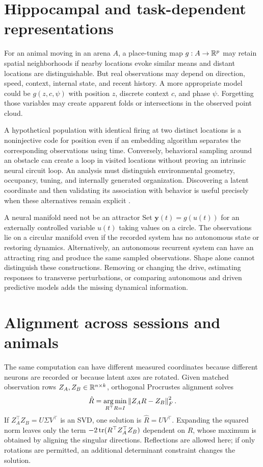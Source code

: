 \section{Hippocampal and task-dependent representations}
For an animal moving in an arena $A$, a place-tuning map $g:A\to\mathbb{R}^p$ may retain spatial neighborhoods if nearby locations evoke similar means and distant locations are distinguishable. But real observations may depend on direction, speed, context, internal state, and recent history. A more appropriate model could be $g(z,c,\psi)$ with position $z$, discrete context $c$, and phase $\psi$. Forgetting those variables may create apparent folds or intersections in the observed point cloud.

A hypothetical population with identical firing at two distinct locations is a noninjective code for position even if an embedding algorithm separates the corresponding observations using time. Conversely, behavioral sampling around an obstacle can create a loop in visited locations without proving an intrinsic neural circuit loop. An analysis must distinguish environmental geometry, occupancy, tuning, and internally generated organization. Discovering a latent coordinate and then validating its association with behavior is useful precisely when these alternatives remain explicit \citep{app_rubin2019}.

\begin{insight}{A neural manifold need not be an attractor}
Set $\mathbf y(t)=g(u(t))$ for an externally controlled variable $u(t)$ taking values on a circle. The observations lie on a circular manifold even if the recorded system has no autonomous state or restoring dynamics. Alternatively, an autonomous recurrent system can have an attracting ring and produce the same sampled observations. Shape alone cannot distinguish these constructions. Removing or changing the drive, estimating responses to transverse perturbations, or comparing autonomous and driven predictive models adds the missing dynamical information.
\end{insight}

\section{Alignment across sessions and animals}
The same computation can have different measured coordinates because different neurons are recorded or because latent axes are rotated. Given matched observation rows $Z_A,Z_B\in\mathbb{R}^{n\times k}$, orthogonal Procrustes alignment solves
\begin{equation}
 \hat R=\operatorname*{arg\,min}_{R^\top R=I}\left\lVert Z_AR-Z_B\right\rVert_F^2.
 \label{eq:08-procrustes}
\end{equation}
If $Z_A^\top Z_B=U\Sigma V^\top$ is an SVD, one solution is $\hat R=UV^\top$. Expanding the squared norm leaves only the term $-2\operatorname{tr}(R^\top Z_A^\top Z_B)$ dependent on $R$, whose maximum is obtained by aligning the singular directions. Reflections are allowed here; if only rotations are permitted, an additional determinant constraint changes the solution.

